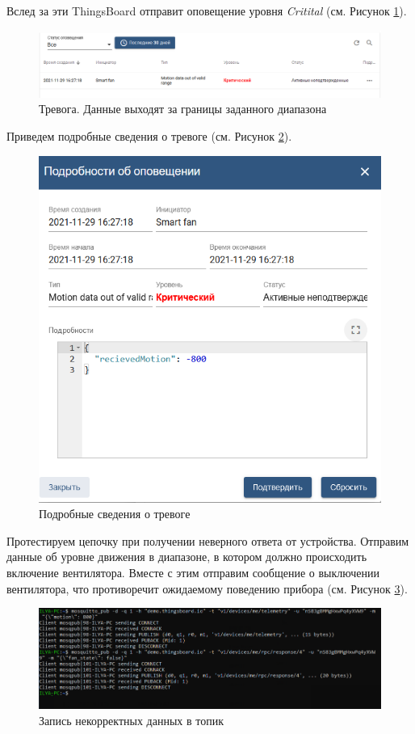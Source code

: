 \documentclass[a4paper,14pt]{extarticle}
\begin{document}
Вслед за эти ThingsBoard отправит оповещение уровня \textit{Critital} (см. Рисунок \ref{fig:alarm-input-value}).

\begin{figure}[h!]
	\centering
	\includegraphics[width=1\linewidth]{images/alarm-input-value}
	\caption{Тревога. Данные выходят за границы заданного диапазона}
	\label{fig:alarm-input-value}
\end{figure}

Приведем подробные сведения о тревоге (см. Рисунок \ref{fig:alarm-input-value-detail}).


\begin{figure}[h!]
	\centering
	\includegraphics[width=0.7\linewidth]{images/alarm-input-value-detail}
	\caption{Подробные сведения о тревоге}
	\label{fig:alarm-input-value-detail}
\end{figure}

\newpage
Протестируем цепочку при получении неверного ответа от устройства. Отправим данные об уровне движения в диапазоне, в котором должно происходить включение вентилятора. Вместе с этим отправим сообщение о выключении вентилятора, что противоречит ожидаемому поведению прибора (см. Рисунок \ref{fig:listen-p2}).

\begin{figure}[h!]
	\centering
	\includegraphics[width=1\linewidth]{images/listen-p2}
	\caption{Запись некорректных данных в топик}
	\label{fig:listen-p2}
\end{figure}
\end{document}
